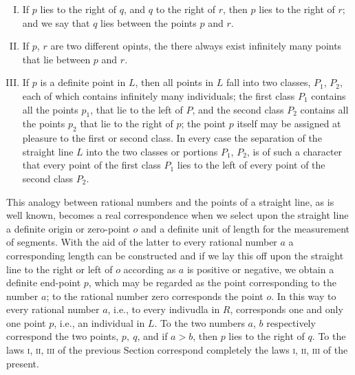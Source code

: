 \documentclass[oneside,12pt]{book}
\begin{document}
\begin{enumerate}[I.]
    \item If $p$ lies to the right of $q$, and $q$ to the right of $r$, then $p$ lies to the right of $r$; and we say that $q$ lies between the points $p$ and $r$.
    \item If $p$, $r$ are two different opints, the there always exist infinitely many points that lie between $p$ and $r$.
    \item If $p$ is a definite point in $L$, then all points in $L$ fall into two classes, $P_1$, $P_2$, each of which contains infinitely many individuals; the first class $P_1$ contains all the points $p_1$, that lie to the left of $P$, and the second class $P_2$ contains all the points $p_2$ that lie to the right of $p$; the point $p$ itself may be assigned at pleasure to the first or second class. In every case the separation of the straight line $L$ into the two classes or portions $P_1$, $P_2$, is of such a character that every point of the first class $P_1$ lies to the left of every point of the second class $P_2$.
\end{enumerate}

This analogy between rational numbers and the points of a straight line, as is well known, becomes a real correspondence when we select upon the straight line a definite origin or zero-point $o$ and a definite unit of length for the measurement of segments. With the aid of the latter to every rational number $a$ a corresponding length can be constructed and if we lay this off upon the straight line to the right or left of $o$ according as $a$ is positive or negative, we obtain a definite end-point $p$, which may be regarded as the point corresponding to the number $a$; to the rational number zero corresponds the point $o$. In this way to every rational number $a$, i.e., to every indivudla in $R$, corresponds one and only one point $p$, i.e., an individual in $L$. To the two numbers $a$, $b$ respectively correspond the two points, $p,\ q$, and if $a>b$, then $p$ lies to the right of $q$. To the laws \textsc{i, ii, iii} of the previous Section correspond completely the laws \textsc{i, ii, iii} of the present. \par 
\end{document}
